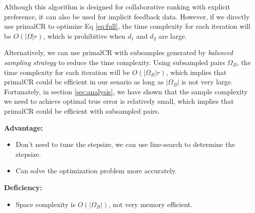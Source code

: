 \documentclass{article}
\numberwithin{equation}{section}
\newtheorem{sampling strategy}{Sampling Strategy}
\begin{document}
Although this algorithm is designed for collaborative ranking with explicit preference, it can also be used for implicit feedback data. However, if we directly use \textsf{primalCR} to optimize Eq \ref{eq:full}, the time complexity for each iteration will be $O(|\Omega|r)$, which is prohibitive when $d_1$ and $d_2$ are large.

Alternatively, we can use \textsf{primalCR} with subsamples generated by \emph{balanced sampling strategy} to reduce the time complexity. Using subsampled pairs $\Omega_B$, the time complexity for each iteration will be $O(|\Omega_B|r)$, which implies that \textsf{primalCR} could be efficient in our senario as long as $|\Omega_B|$ is not very large. Fortunately, in section \ref{sec:analysis}, we have shown that the sample complexity we need to achieve optimal true error is relatively small, which implies that \textsf{primalCR} could be efficient with subsampled pairs.

\textbf{Advantage: } 
\begin{itemize}
    \item Don't need to tune the stepsize, we can use line-search to determine the stepsize.
    \item Can solve the optimization problem more accurately.
\end{itemize}
\textbf{Deficiency:}
\begin{itemize}
    \item Space complexity is $O(|\Omega_B|)$, not very memory efficient.
\end{itemize}
\end{document}
